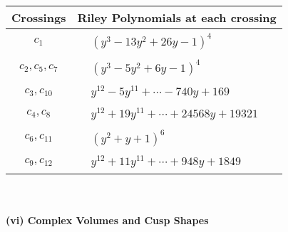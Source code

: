 \documentclass[1p]{elsarticle_modified}
\theoremstyle{definition}
\begin{document}
\begin{tabular}{m{50pt}|m{274pt}}
Crossings & \hspace{64pt}Riley Polynomials at each crossing \\
\hline $$\begin{aligned}c_{1}\end{aligned}$$&$\begin{aligned}
&(y^3-13 y^2+26 y-1)^4
\end{aligned}$\\
\hline $$\begin{aligned}c_{2},c_{5},c_{7}\end{aligned}$$&$\begin{aligned}
&(y^3-5 y^2+6 y-1)^4
\end{aligned}$\\
\hline $$\begin{aligned}c_{3},c_{10}\end{aligned}$$&$\begin{aligned}
&y^{12}-5 y^{11}+\cdots-740 y+169
\end{aligned}$\\
\hline $$\begin{aligned}c_{4},c_{8}\end{aligned}$$&$\begin{aligned}
&y^{12}+19 y^{11}+\cdots+24568 y+19321
\end{aligned}$\\
\hline $$\begin{aligned}c_{6},c_{11}\end{aligned}$$&$\begin{aligned}
&(y^2+y+1)^6
\end{aligned}$\\
\hline $$\begin{aligned}c_{9},c_{12}\end{aligned}$$&$\begin{aligned}
&y^{12}+11 y^{11}+\cdots+948 y+1849
\end{aligned}$\\
\hline
\end{tabular}\\~\\
\newpage\flushleft \textbf{(vi) Complex Volumes and Cusp Shapes}
\end{document}
